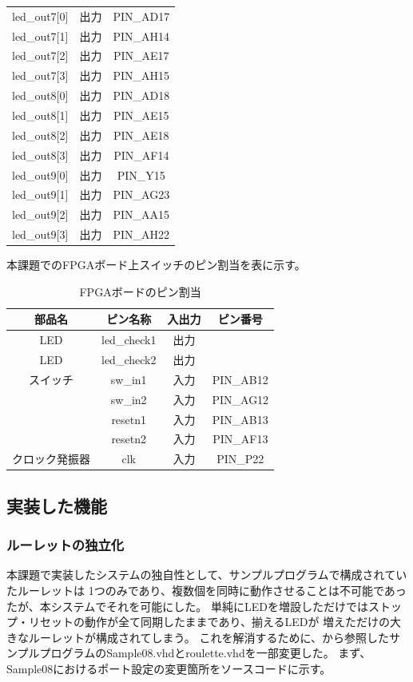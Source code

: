 \documentclass{ltjsarticle}
\begin{document}
\begin{table}[H]
\begin{center}
\begin{tabular}{cc|c}
			led\_out7[0]&出力&PIN\_AD17\\
			led\_out7[1]&出力&PIN\_AH14\\
			led\_out7[2]&出力&PIN\_AE17\\
			led\_out7[3]&出力&PIN\_AH15\\
			led\_out8[0]&出力&PIN\_AD18\\
			led\_out8[1]&出力&PIN\_AE15\\
			led\_out8[2]&出力&PIN\_AE18\\
			led\_out8[3]&出力&PIN\_AF14\\
			led\_out9[0]&出力&PIN\_Y15\\
			led\_out9[1]&出力&PIN\_AG23\\
			led\_out9[2]&出力&PIN\_AA15\\
			led\_out9[3]&出力&PIN\_AH22\\ \hline
		\end{tabular}
		\end{center}
		\end{table}

	本課題でのFPGAボード上スイッチのピン割当を表に示す。
		\begin{table}[H]
		\begin{center}
		\caption{FPGAボードのピン割当}
		\label{tab:SWpin}
		\begin{tabular}{c|cc|c} \toprule
			部品名&ピン名称&入出力&ピン番号\\ \hline
			LED&led\_check1&出力&\\
			LED&led\_check2&出力&\\ \hline
			スイッチ&sw\_in1&入力&PIN\_AB12\\
			&sw\_in2&入力&PIN\_AG12\\
			&resetn1&入力&PIN\_AB13\\
			&resetn2&入力&PIN\_AF13\\ \hline
			クロック発振器&clk&入力&PIN\_P22\\
		\bottomrule
		\end{tabular}
		\end{center}
		\end{table}
	\subsection{実装した機能}
		\subsubsection{ルーレットの独立化}
			本課題で実装したシステムの独自性として、サンプルプログラムで構成されていたルーレットは
			1つのみであり、複数個を同時に動作させることは不可能であったが、本システムでそれを可能にした。
			単純にLEDを増設しただけではストップ・リセットの動作が全て同期したままであり、揃えるLEDが
			増えただけの大きなルーレットが構成されてしまう。
			これを解消するために、\cite{ref:指導書}から参照したサンプルプログラムのSample08.vhdとroulette.vhdを一部変更した。
			まず、Sample08におけるポート設定の変更箇所をソースコードに示す。
\end{document}
